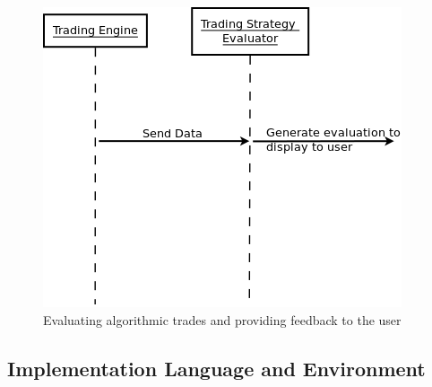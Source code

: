 \documentclass{article}
\begin{document}
\begin{figure}
  \centering
  \includegraphics[width=\textwidth]{sequencediagram3}
  \caption{Evaluating algorithmic trades and providing feedback to the user}
\end{figure}



\subsection{Implementation Language and Environment}
\end{document}
